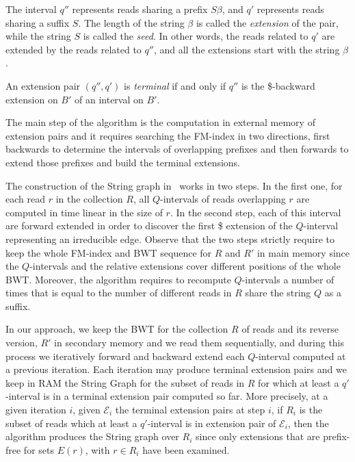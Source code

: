 \documentclass[runningheads,envcountsame,a4paper]{llncs}
\newcommand{\notaestesa}[2]{%
  {\sffamily {\bfseries #1}{\footnotesize #2}}%
  \marginpar{\framebox{\Large *}}%
}
\begin{document}
The interval $q''$ represents reads sharing a prefix $S\beta$, and $q'$
represents reads sharing a suffix $S$.
The length of the string $\beta$ is called the \emph{extension} of the
pair, while the string $S$ is called the \emph{seed}.
In other words, the reads related to $q'$ are extended by the reads
related to $q''$, and all the extensions start with the string $\beta$.

An extension pair $(q'', q')$ is \emph{terminal} if and only if $q''$ is
the \$-backward extension on $B'$ of an interval on $B'$.
\notaestesa{Paola}{rivedere anche in termini informali}


The main step of the algorithm is the computation in external memory of
extension pairs and it requires searching the FM-index in two
directions, first backwards to determine the intervals of overlapping
prefixes and then forwards to extend those prefixes and build the
terminal extensions.

The construction of the String graph in~\cite{Simpson2010} works in two
steps.
In the first one, for each read $r$ in the collection $R$, all
$Q$-intervals of reads overlapping $r$ are computed in time linear in
the size of $r$.
In the second step, each of this interval are forward extended in order
to discover the first \$ extension of the $Q$-interval representing an
irreducible edge.
Observe that the two steps strictly require to keep the whole FM-index
and BWT sequence for $R$ and $R'$ in main memory since the $Q$-intervals
and the relative extensions cover different positions of the whole BWT.
Moreover, the algorithm requires to recompute $Q$-intervals a number of
times that is equal to the number of different reads in $R$ share the
string $Q$ as a suffix.


In our approach, we keep the BWT for the collection $R$ of reads and its
reverse version, $R'$ in secondary memory and we read them sequentially,
and during this process we iteratively forward and backward extend each
$Q$-interval computed at a previous iteration.
Each iteration may produce terminal extension pairs and we keep in RAM
the String Graph for the subset of reads in $R$ for which at least a
$q'$-interval is in a terminal extension pair computed so far.
More precisely, at a given iteration $i$, given $\mathcal{E}_i$ the
terminal extension pairs at step $i$, if $R_i$ is the subset of reads
which at least a $q'$-interval is in extension pair of $\mathcal{E}_i$,
then the algorithm produces the String graph over $R_i$ since only
extensions that are prefix-free for sets $E(r)$, with $r \in R_i$ have
been examined.
\end{document}
